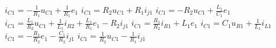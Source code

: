$i_{C1}=-\frac{1}{R_1}u_{C1}+\frac{1}{R_1}e_1$
$i_{C1}=R_2 u_{C1}+R_1 i_{j1}$
$i_{C1}=-R_2 u_{C1}+\frac{L_1}{C_1}e_1$
$i_{C1}=\frac{L_1}{R_2}u_{C1}+\frac{1}{L_1}i_{R2}+\frac{L_1}{R_1}e_1-R_2 i_{j1}$
$i_{C1}=\frac{R_1}{R_2}i_{R1}+L_1 e_1$
$i_{C1}=C_1 u_{R1}+\frac{1}{L_1}i_{L1}$
$i_{C1}=-\frac{R_1}{R_2}e_{1}-\frac{C_1}{R_2}i_{j1}$
$i_{C1}=\frac{1}{R_2}u_{C1}-\frac{1}{R_1}i_{j1}$
